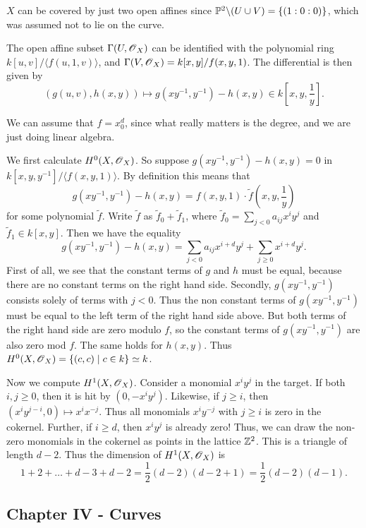\documentclass[11pt, english]{article}
\begin{document}
\begin{sol}
 $X$ can be covered by just two open affines since $\mathbb{P}^2 \backslash (U \cup V) = \{(1:0:0)\}$, which was assumed not to lie on the curve.

The open affine subset $\Gamma(U, \operatorname{\mathscr{O}}_X)$ can be identified with the polynomial ring $k[u,v]/\langle f(u,1,v) \rangle$, and $\Gamma(V,\operatorname{\mathscr{O}}_X) = k[x,y]/f(x,y,1)$. The differential is then given by 
\[
\left( g(u,v), h(x,y) \right) \mapsto g(xy^{-1},y^{-1})-h(x,y) \in k[x,y,\frac 1y].
\]

We can assume that $f=x_0^d$, since what really matters is the degree, and we are just doing linear algebra.

We first calculate $H^0(X,\operatorname{\mathscr{O}}_X)$. So suppose $g(xy^{-1}, y^{-1})-h(x,y)=0$ in $k[x,y,y^{-1}]/\langle f(x,y,1) \rangle$. By definition this means that
\[
g(xy^{-1},y^{-1}) - h(x,y) = f(x,y,1) \cdot \tilde f(x,y,\frac 1y)
\]
for some polynomial $\tilde f$. Write $\tilde f$ as $\tilde f_0 + \tilde f_1$, where $\tilde f_0=\sum_{j < 0} a_{ij} x^i y^j$ and $\tilde f_1 \in k[x,y]$. Then we have the equality
\[
g(xy^{-1},y^{-1}) - h(x,y) = \sum_{j < 0} a_{ij}x^{i+d}y^j + \sum_{j \geq 0} x^{i+d} y^j.
\]
First of all, we see that the constant terms of $g$ and $h$ must be equal, because there are no constant terms on the right hand side. Secondly, $g(xy^{-1},y^{-1})$ consists solely of terms with $j < 0$. Thus the non constant terms of  $g(xy^{-1},y^{-1})$ must be equal to the left term of the right hand side above. But both terms of the right hand side are zero modulo $f$, so the constant terms of $g(xy^{-1},y^{-1})$ are also zero mod $f$. The same holds for $h(x,y)$. Thus $H^0(X,\operatorname{\mathscr{O}}_X)= \{ (c,c) \mid c \in k \} \simeq k$.

Now we compute $H^1(X,\operatorname{\mathscr{O}}_X)$. Consider a monomial $x^iy^j$ in the target. If both $i,j \geq 0$, then it is hit by $(0,-x^iy^j)$. Likewise, if $j \geq i$, then $(x^iy^{j-i},0) \mapsto x^i x^{-j}$. Thus all monomials $x^iy^{-j}$ with $j \geq i$ is zero in the cokernel. Further, if $i \geq d$, then $x^i y^j$ is already zero! Thus, we can draw the non-zero monomials in the cokernel as points in the lattice $\mathbb{Z}^2$. This is a triangle of length $d-2$. Thus the dimension of $H^1(X,\operatorname{\mathscr{O}}_X)$ is 
\[
1 + 2 + \ldots+ d-3 + d-2 = \frac 12 (d-2)(d-2+1) = \frac 12 (d-2)(d-1).
\]
\end{sol}

\subsection{Chapter IV - Curves}
\end{document}
